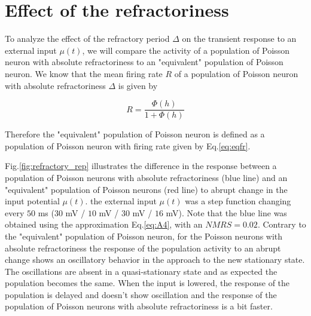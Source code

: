 \documentclass[12pt,twoside]{report}
\begin{document}
\section{Effect of the refractoriness}



To analyze the effect of the refractory period $\Delta$ on the transient response to an external input $\mu(t)$, we will compare the activity of a population of Poisson neuron with absolute refractoriness to an "equivalent" population of Poisson neuron. We know that the mean firing rate $R$ of a population of Poisson neuron with absolute refractoriness $\Delta$ is given by 

\begin{equation}
\label{eq:eqfr}
R=\frac{\Phi(h)}{1+\Phi(h)}
\end{equation}

Therefore the "equivalent" population of Poisson neuron is defined as a population of Poisson neuron with firing rate given by Eq.\eqref{eq:eqfr}.


Fig.\ref{fig:refractory_rep} illustrates the difference in the response between a population of Poisson neurons with absolute refractoriness (blue line) and an "equivalent" population of Poisson neurons (red line) to abrupt change in the input potential $\mu(t)$. the external input $\mu(t)$ was a step function changing every $50$ ms ($30$ mV / $10$ mV / $30$ mV / $16$ mV). Note that the blue line was obtained using the approximation Eq.\ref{eq:A4}, with an $NMRS=0.02$. Contrary to the "equivalent" population of Poisson neuron, for the Poisson neurons with absolute refractoriness the response of the population activity to an abrupt change shows an oscillatory behavior in the approach to the new stationary state. The oscillations are absent in a quasi-stationary state and as expected the population becomes the same. When the input is lowered, the response of the population is delayed and doesn't show oscillation and the response of the population of Poisson neurons with absolute refractoriness is a bit faster.
\end{document}
